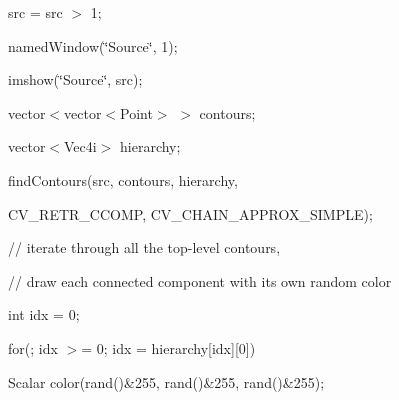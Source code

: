 {\ttfamily }

{\ttfamily }

{\ttfamily src = src $>$ 1;}

{\ttfamily }

{\ttfamily }

{\ttfamily named\+Window(\char`\"{}\+Source\char`\"{}, 1);}

{\ttfamily }

{\ttfamily }

{\ttfamily imshow(\char`\"{}\+Source\char`\"{}, src);}

{\ttfamily }

{\ttfamily }

{\ttfamily vector$<$vector$<$\+Point$>$ $>$ contours;}

{\ttfamily }

{\ttfamily }

{\ttfamily vector$<$\+Vec4i$>$ hierarchy;}

{\ttfamily }

{\ttfamily }

{\ttfamily find\+Contours(src, contours, hierarchy,}

{\ttfamily }

{\ttfamily }

{\ttfamily C\+V\+\_\+\+R\+E\+T\+R\+\_\+\+C\+C\+O\+MP, C\+V\+\_\+\+C\+H\+A\+I\+N\+\_\+\+A\+P\+P\+R\+O\+X\+\_\+\+S\+I\+M\+P\+LE);}

{\ttfamily }

{\ttfamily }

{\ttfamily // iterate through all the top-\/level contours,}

{\ttfamily }

{\ttfamily }

{\ttfamily // draw each connected component with its own random color}

{\ttfamily }

{\ttfamily }

{\ttfamily int idx = 0;}

{\ttfamily }

{\ttfamily }

{\ttfamily for(; idx $>$= 0; idx = hierarchy\mbox{[}idx\mbox{]}\mbox{[}0\mbox{]})}

{\ttfamily }

{\ttfamily }

{\ttfamily Scalar color(rand()\&255, rand()\&255, rand()\&255);}

{\ttfamily }

{\ttfamily }

